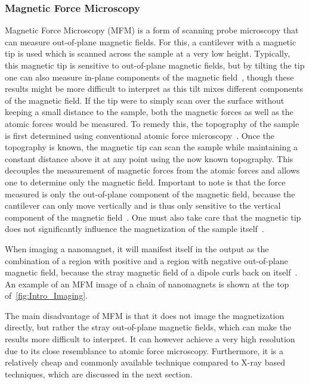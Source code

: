 \documentclass[11pt,a4paper,english]{article}
\begin{document}
\subsubsection{Magnetic Force Microscopy}
Magnetic Force Microscopy (MFM) is a form of scanning probe microscopy that can measure out-of-plane magnetic fields. For this, a cantilever with a magnetic tip is used which is scanned across the sample at a very low height. Typically, this magnetic tip is sensitive to out-of-plane magnetic fields, but by tilting the tip one can also measure in-plane components of the magnetic field~\cite{MFM_inplane}, though these results might be more difficult to interpret as this tilt mixes different components of the magnetic field. If the tip were to simply scan over the surface without keeping a small distance to the sample, both the magnetic forces as well as the atomic forces would be measured. To remedy this, the topography of the sample is first determined using conventional atomic force microscopy~\cite{NML_Carlton, PEEM}. Once the topography is known, the magnetic tip can scan the sample while maintaining a constant distance above it at any point using the now known topography. This decouples the measurement of magnetic forces from the atomic forces and allows one to determine only the magnetic field. Important to note is that the force measured is only the out-of-plane component of the magnetic field, because the cantilever can only move vertically and is thus only sensitive to the vertical component of the magnetic field~\cite{NML_Carlton}. One must also take care that the magnetic tip does not significantly influence the magnetization of the sample itself~\cite{Probing_MagnetoOptics}. \par
When imaging a nanomagnet, it will manifest itself in the output as the combination of a region with positive and a region with negative out-of-plane magnetic field, because the stray magnetic field of a dipole curls back on itself~\cite{NML_Carlton}. An example of an MFM image of a chain of nanomagnets is shown at the top of~\cref{fig:Intro_Imaging}. \par
The main disadvantage of MFM is that it does not image the magnetization directly, but rather the stray out-of-plane magnetic fields, which can make the results more difficult to interpret. It can however achieve a very high resolution due to its close resemblance to atomic force microscopy. Furthermore, it is a relatively cheap and commonly available technique compared to X-ray based techniques, which are discussed in the next section.
\end{document}
